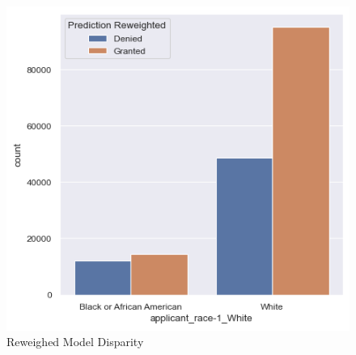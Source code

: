 \begin{figure}[h]
\begin{minipage}{0.5\textwidth}
        \includegraphics[width=\textwidth]{images/loan_grants_by_protected_attributes/reweighted.png}
        \caption{Reweighed Model Disparity}
        \label{fig:Reweighed_Disparity}
    \end{minipage}
    
    \vspace{1em} 
    

\end{figure}
